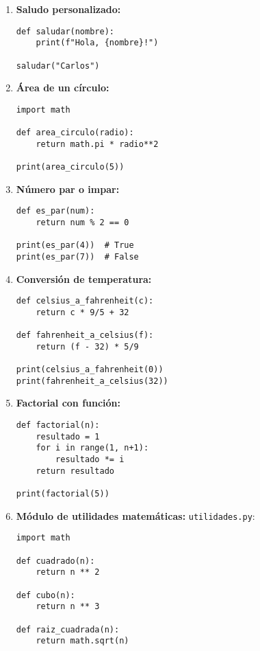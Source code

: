 \documentclass[12pt,a4paper]{article}
\begin{document}
\begin{enumerate}[label=\textbf{Ejercicio \arabic*:}, leftmargin=1.5cm]
    \item \textbf{Saludo personalizado:}
    \begin{lstlisting}
def saludar(nombre):
    print(f"Hola, {nombre}!")

saludar("Carlos")
    \end{lstlisting}
    
    \item \textbf{Área de un círculo:}
    \begin{lstlisting}
import math

def area_circulo(radio):
    return math.pi * radio**2

print(area_circulo(5))
    \end{lstlisting}
    
    \item \textbf{Número par o impar:}
    \begin{lstlisting}
def es_par(num):
    return num % 2 == 0

print(es_par(4))  # True
print(es_par(7))  # False
    \end{lstlisting}
    
    \item \textbf{Conversión de temperatura:}
    \begin{lstlisting}
def celsius_a_fahrenheit(c):
    return c * 9/5 + 32

def fahrenheit_a_celsius(f):
    return (f - 32) * 5/9

print(celsius_a_fahrenheit(0))
print(fahrenheit_a_celsius(32))
    \end{lstlisting}
    
    \item \textbf{Factorial con función:}
    \begin{lstlisting}
def factorial(n):
    resultado = 1
    for i in range(1, n+1):
        resultado *= i
    return resultado

print(factorial(5))
    \end{lstlisting}
    
    \item \textbf{Módulo de utilidades matemáticas:}
    \texttt{utilidades.py}:
    \begin{lstlisting}
import math

def cuadrado(n):
    return n ** 2

def cubo(n):
    return n ** 3

def raiz_cuadrada(n):
    return math.sqrt(n)
    \end{lstlisting}
    

\end{enumerate}
\end{document}
